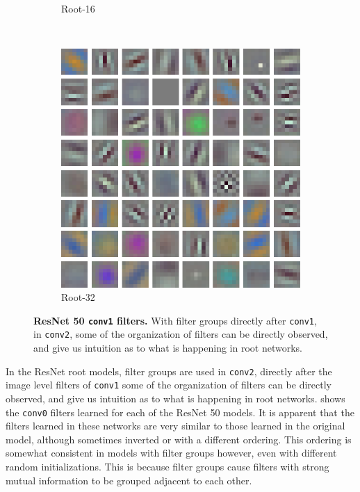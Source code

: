 \documentclass[thesis]{subfiles}
\begin{document}
\begin{figure}[tb]
\begin{subfigure}[b]{0.45\textwidth}
			\caption{Root-16}
			\label{fig:resnet50root16conv0}
		\end{subfigure}
		~
		\begin{subfigure}[b]{0.45\textwidth}
			\centering
			\includegraphics[width=\textwidth]{Figs/Raster/msrc-resnet-50-conv1-root64-convonly}
			\caption{Root-32}
			\label{fig:resnet50root32conv0}
		\end{subfigure}
		\caption[ResNet 50 conv1 filters]{\textbf{ResNet 50 \texttt{conv1} filters.} With filter groups directly after \texttt{conv1}, in \texttt{conv2}, some of the organization of filters can be directly observed, and give us intuition as to what is happening in root networks.}
		\label{fig:resnet50conv0}
	\end{figure}
	In the ResNet root models, filter groups are used in \texttt{conv2},  directly after the image level filters of \texttt{conv1} some of the organization of filters can be directly observed, and give us intuition as to what is happening in root networks.  shows the \texttt{conv0} filters learned for each of the ResNet 50 models. It is apparent that the filters learned in these networks are very similar to those learned in the original model, although sometimes inverted or with a different ordering. This ordering is somewhat consistent in models with filter groups however, even with different random initializations. This is because filter groups cause filters with strong mutual information to be grouped adjacent to each other.
	
\end{document}
